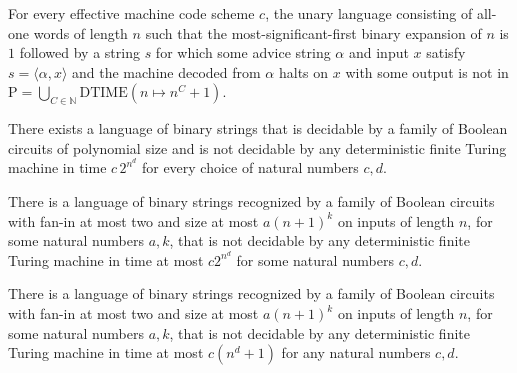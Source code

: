 \begin{theorem}
\label{Complexity.UHALT_not_mem_P}
\leanok
{}
For every effective machine code scheme $c$, the unary language consisting of all-one
words of length $n$ such that the most-significant-first binary expansion of $n$ is $1$
followed by a string $s$ for which some advice string $\alpha$ and input $x$ satisfy
$s=\langle\alpha,x\rangle$ and the machine decoded from $\alpha$ halts on $x$ with some
output is not in $\mathrm{P}=\bigcup_{C\in\mathbb{N}}\mathrm{DTIME}(n\mapsto n^C+1)$.
\end{theorem}

\begin{theorem}
\label{Complexity.exists_mem_PPoly_not_mem_EXP}
\leanok
{}
There exists a language of binary strings that is decidable by a family of Boolean
circuits of polynomial size and is not decidable by any deterministic finite Turing
machine in time $c\,2^{n^d}$ for every choice of natural numbers $c,d$.
\end{theorem}

\begin{theorem}
\label{Complexity.PPoly_not_subset_EXP}
\leanok
{}
There is a language of binary strings recognized by a family of Boolean circuits with
fan-in at most two and size at most $a(n+1)^k$ on inputs of length $n$, for some natural
numbers $a,k$, that is not decidable by any deterministic finite Turing machine in time
at most $c2^{n^d}$ for some natural numbers $c,d$.
\end{theorem}

\begin{theorem}
\label{Complexity.PPoly_not_subset_P}
\leanok
{}
There is a language of binary strings recognized by a family of Boolean circuits with
fan-in at most two and size at most $a(n+1)^k$ on inputs of length $n$, for some natural
numbers $a,k$, that is not decidable by any deterministic finite Turing machine in time
at most $c(n^d+1)$ for any natural numbers $c,d$.
\end{theorem}

